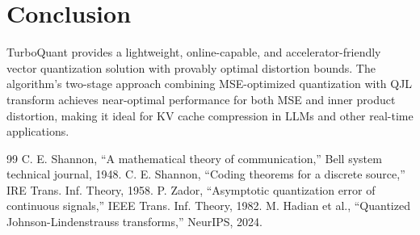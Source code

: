 \documentclass[11pt]{article}
\begin{document}
\section{Conclusion}

TurboQuant provides a lightweight, online-capable, and accelerator-friendly vector quantization solution with provably optimal distortion bounds. The algorithm's two-stage approach combining MSE-optimized quantization with QJL transform achieves near-optimal performance for both MSE and inner product distortion, making it ideal for KV cache compression in LLMs and other real-time applications.

\begin{thebibliography}{99}
 C. E. Shannon, ``A mathematical theory of communication,'' Bell system technical journal, 1948.
 C. E. Shannon, ``Coding theorems for a discrete source,'' IRE Trans. Inf. Theory, 1958.
 P. Zador, ``Asymptotic quantization error of continuous signals,'' IEEE Trans. Inf. Theory, 1982.
 M. Hadian et al., ``Quantized Johnson-Lindenstrauss transforms,'' NeurIPS, 2024.
\end{thebibliography}
\end{document}
